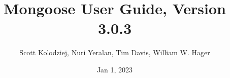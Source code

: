 \title{Mongoose User Guide, Version 3.0.3}
\author{Scott Kolodziej, Nuri Yeralan, Tim Davis, William W. Hager}
\date{Jan 1, 2023}
